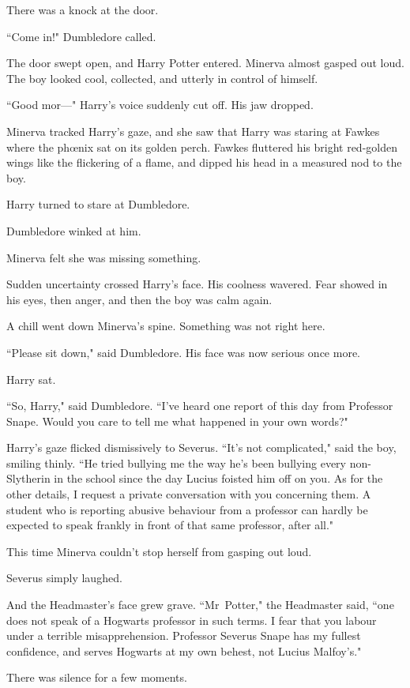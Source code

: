There was a knock at the door.

``Come in!" Dumbledore called.

The door swept open, and Harry Potter entered. Minerva almost gasped out loud. The boy looked cool, collected, and utterly in control of himself.

``Good mor—" Harry's voice suddenly cut off. His jaw dropped.

Minerva tracked Harry's gaze, and she saw that Harry was staring at Fawkes where the phœnix sat on its golden perch. Fawkes fluttered his bright red-golden wings like the flickering of a flame, and dipped his head in a measured nod to the boy.

Harry turned to stare at Dumbledore.

Dumbledore winked at him.

Minerva felt she was missing something.

Sudden uncertainty crossed Harry's face. His coolness wavered. Fear showed in his eyes, then anger, and then the boy was calm again.

A chill went down Minerva's spine. Something was not right here.

``Please sit down," said Dumbledore. His face was now serious once more.

Harry sat.

``So, Harry," said Dumbledore. ``I've heard one report of this day from Professor Snape. Would you care to tell me what happened in your own words?"

Harry's gaze flicked dismissively to Severus. ``It's not complicated," said the boy, smiling thinly. ``He tried bullying me the way he's been bullying every non-Slytherin in the school since the day Lucius foisted him off on you. As for the other details, I request a private conversation with you concerning them. A student who is reporting abusive behaviour from a professor can hardly be expected to speak frankly in front of that same professor, after all."

This time Minerva couldn't stop herself from gasping out loud.

Severus simply laughed.

And the Headmaster's face grew grave. ``Mr~Potter," the Headmaster said, ``one does not speak of a Hogwarts professor in such terms. I fear that you labour under a terrible misapprehension. Professor Severus Snape has my fullest confidence, and serves Hogwarts at my own behest, not Lucius Malfoy's."

There was silence for a few moments.

